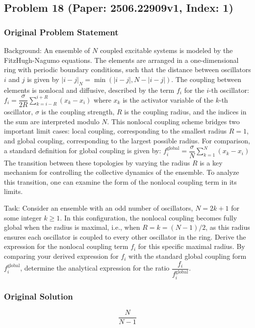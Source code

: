 \documentclass[10pt]{article}
\begin{document}
\newpage
\subsection*{Problem 18 (Paper: 2506.22909v1, Index: 1)}

\subsubsection*{Original Problem Statement}
Background:
An ensemble of $N$ coupled excitable systems is modeled by the FitzHugh-Nagumo equations. The elements are arranged in a one-dimensional ring with periodic boundary conditions, such that the distance between oscillators $i$ and $j$ is given by $|i-j|_N = \min(|i-j|, N-|i-j|)$. The coupling between elements is nonlocal and diffusive, described by the term $f_i$ for the $i$-th oscillator:
$f_i = \dfrac{\sigma}{2R} \sum\limits_{k=i-R}^{i+R}(x_k-x_i)$
where $x_k$ is the activator variable of the $k$-th oscillator, $\sigma$ is the coupling strength, $R$ is the coupling radius, and the indices in the sum are interpreted modulo $N$. This nonlocal coupling scheme bridges two important limit cases: local coupling, corresponding to the smallest radius $R=1$, and global coupling, corresponding to the largest possible radius. For comparison, a standard definition for global coupling is given by:
$f_i^{\text{global}} = \dfrac{\sigma}{N} \sum\limits_{k=1}^{N}(x_k-x_i)$
The transition between these topologies by varying the radius $R$ is a key mechanism for controlling the collective dynamics of the ensemble. To analyze this transition, one can examine the form of the nonlocal coupling term in its limits.

Task:
Consider an ensemble with an odd number of oscillators, $N=2k+1$ for some integer $k \ge 1$. In this configuration, the nonlocal coupling becomes fully global when the radius is maximal, i.e., when $R=k=(N-1)/2$, as this radius ensures each oscillator is coupled to every other oscillator in the ring. Derive the expression for the nonlocal coupling term $f_i$ for this specific maximal radius. By comparing your derived expression for $f_i$ with the standard global coupling form $f_i^{\text{global}}$, determine the analytical expression for the ratio $\dfrac{f_i}{f_i^{\text{global}}}$.

\subsubsection*{Original Solution}
\[ \dfrac{N}{N-1} \]
\end{document}
